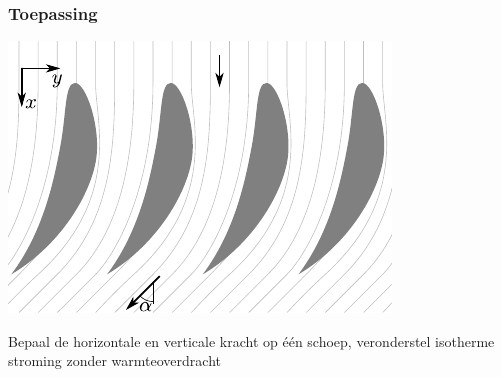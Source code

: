 \documentclass[t]{beamer}
\begin{document}
	\begin{frame}
		\frametitle{Toepassing}
		\vspace{1cm}
		\centering
		\includegraphics{fig/controlevolumes/Schoepenrij_zonder_controlevolume}
		
		Bepaal de horizontale en verticale kracht op één schoep, veronderstel isotherme stroming zonder warmteoverdracht
	\end{frame}
\end{document}
